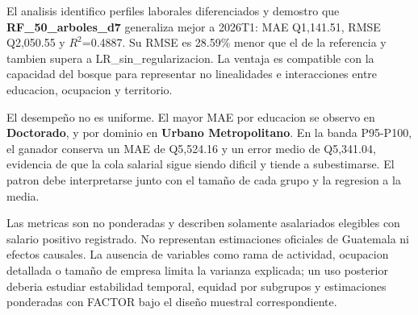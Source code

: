 El analisis identifico perfiles laborales diferenciados y demostro que \textbf{RF\_50\_arboles\_d7} generaliza mejor a 2026T1: MAE Q1,141.51, RMSE Q2,050.55 y $R^2$=0.4887. Su RMSE es 28.59\% menor que el de la referencia y tambien supera a LR\_sin\_regularizacion. La ventaja es compatible con la capacidad del bosque para representar no linealidades e interacciones entre educacion, ocupacion y territorio.

El desempeño no es uniforme. El mayor MAE por educacion se observo en \textbf{Doctorado}, y por dominio en \textbf{Urbano Metropolitano}. En la banda P95-P100, el ganador conserva un MAE de Q5,524.16 y un error medio de Q5,341.04, evidencia de que la cola salarial sigue siendo dificil y tiende a subestimarse. El patron debe interpretarse junto con el tamaño de cada grupo y la regresion a la media.

Las metricas son no ponderadas y describen solamente asalariados elegibles con salario positivo registrado. No representan estimaciones oficiales de Guatemala ni efectos causales. La ausencia de variables como rama de actividad, ocupacion detallada o tamaño de empresa limita la varianza explicada; un uso posterior deberia estudiar estabilidad temporal, equidad por subgrupos y estimaciones ponderadas con FACTOR bajo el diseño muestral correspondiente.
